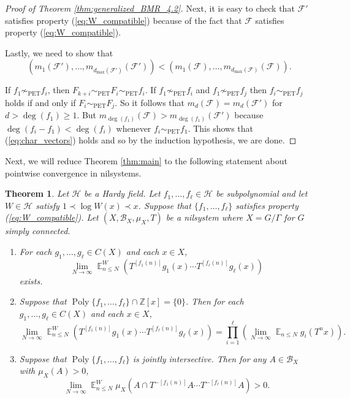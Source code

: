 \documentclass[12pt]{article}
\theoremstyle{plain} %
\newtheorem{theorem}{Theorem}[section]
\theoremstyle{definition} %
\theoremstyle{plain}
\theoremstyle{plain}
\numberwithin{equation}{section}
\newcommand{\Z}{\mathbb{Z}}
\renewcommand{\leq}{\leqslant}
\renewcommand{\geq}{\geqslant}
\newcommand{\1}{\mathbbm{1}}
\newcommand{\E}{\operatorname{\mathbb{E}}}
\newcommand{\Poly}{\operatorname{Poly}}
\newcommand{\oo}{\infty}
\newcommand{\round}[1]{[ #1 ]}
\newcommand{\psim}{\sim_{\text{PET}}}
\begin{document}
\begin{proof}[Proof of Theorem \ref{thm:generalized_BMR_4.2}]
Next, it is easy to check that $\mathscr{F}'$ satisfies property (\ref{eq:W_compatible}) because of the fact that $\mathscr{F}$ satisfies property (\ref{eq:W_compatible}).


Lastly, we need to show that
\begin{equation}\label{eq:char_vectors}
(m_1(\mathscr{F}'),\dots, m_{d_{\max}(\mathscr{F}')}({\mathscr{F}}'))<(m_1(\mathscr{F}),\dots, m_{d_{\max}(\mathscr{F})}({\mathscr{F}})).
\end{equation}


If $f_1\not\psim f_i$, then $F_{k+i}\psim F_i \psim f_i$. If $f_1\not\psim f_i$ and $f_1\not\psim f_j$ then $f_i\psim f_j$ holds if and only if $F_{i}\psim F_j$. So it follows that $m_d(\mathscr{F}) = m_{d}(\mathscr{F}')$ for $d>\deg(f_1)\geq 1$. But $m_{\deg(f_1)}(\mathscr{F})>m_{\deg(f_1)}(\mathscr{F}')$ because $\deg(f_i-f_1)<\deg(f_i)$ whenever $f_i\psim f_1$. This shows that (\ref{eq:char_vectors}) holds and so by the induction hypothesis,
we are done.
\end{proof}


Next, we will reduce Theorem \ref{thm:main} to the following statement about pointwise convergence in nilsystems.
\begin{theorem}\label{thm:true_for_nilsystem}
 Let $\mathcal{H}$ be a Hardy field. Let $f_1,\dots, f_{\ell}\in \mathcal{H}$ be  subpolynomial and let $W\in \mathcal{H}$ satisfy $1\prec \log W(x)\prec x$. Suppose that $\{f_1,\dots, f_{\ell}\}$ satisfies property (\ref{eq:W_compatible}). Let $(X,\mathscr{B}_X,\mu_X,T)$ be a nilsystem where $X= G/\Gamma$ for $G$ simply connected. 
     \begin{enumerate}[label = (\roman*)]
         \item For each $g_1,\dots, g_{\ell}\in C(X)$ and each $x\in X$,
         \begin{equation}\label{eq:new_eq_1}
             \lim_{N\to\oo}\E_{n\leq N}^W(T^{\round{f_1(n)}}g_1(x)\cdots T^{\round{f_{\ell}(n)}}g_{\ell}(x))
         \end{equation}
         exists.
        \item Suppose that $\Poly\{f_1,\dots, f_{\ell}\}\cap \Z[x]=\{0\}$. Then for each $g_1,\dots, g_{\ell}\in C(X)$ and each $x\in X$,
        \begin{equation}\label{eq:new_eq_2}
             \lim_{N\to\oo}\E_{n\leq N}^W(T^{\round{f_1(n)}}g_1(x)\cdots T^{\round{f_{\ell}(n)}}g_{\ell}(x)) = \prod_{i=1}^{\ell}\left(\lim_{N\to\oo}\E_{n\leq N}g_i(T^nx)\right).
         \end{equation}
         \item 
         Suppose that $\Poly\{f_1,\dots, f_{\ell}\}$ is jointly intersective.
         Then for any $A\in \mathscr{B}_X$ with $\mu_X(A)>0$,
        \begin{equation}\label{eq:new_eq_3}
             \lim_{N\to\oo}\E_{n\leq N}^W\mu_X(A\cap T^{-\round{f_1(n)}}A\cdots T^{-\round{f_{\ell}(n)}}A) >0.
         \end{equation}
     \end{enumerate}
\end{theorem}
\end{document}

